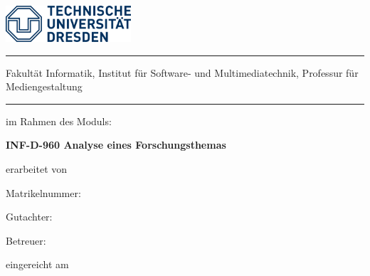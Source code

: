 \makeatletter
\begin{titlepage}
	\RaggedRight
	\includegraphics[width=0.35\textwidth]{resources/logoTUD.png}\par\vspace{0cm}
	\noindent\rule{\textwidth}{0.4pt}
	{\normalfont\mdseries\small\sffamily Fakultät Informatik,}
	{\normalfont\mdseries\small\sffamily Institut für Software- und Multimediatechnik, Professur für Mediengestaltung}
	\vspace{2mm}\noindent\hrule
	\vspace{3cm}
	{\normalfont\Large \thesistype \par}
	\vspace{1cm}
	{\normalfont\Huge\mdseries\sffamily \@title\par}
	\vspace{1.5cm}
	{\normalfont\large im Rahmen des Moduls:\par}
	{\normalfont\Large\bfseries INF-D-960 Analyse eines Forschungsthemas \par}
	\vspace{1cm}
	{\sffamily\large\mdseries erarbeitet von\par}
	\vspace{1.5mm}
	{\normalfont\Large \@author\par}
	\vspace{0.5mm}
	{\normalfont\large Matrikelnummer: \matnr \par}
	\vspace{2.0cm}
	{\sffamily\large Gutachter:\par}
    \vspace{1mm}
	{\normalfont\large \gutachter \par}
	\vspace{7mm}
	{\sffamily\large Betreuer:\par}
	\vspace{0.7mm}
	{\normalfont\large \betreuer \par}
	\vspace{1cm}
	{\sffamily\large\mdseries eingereicht am\par}
	\vspace{1mm}
	{\normalfont\normalsize \@date \par}
\end{titlepage}
\makeatother
